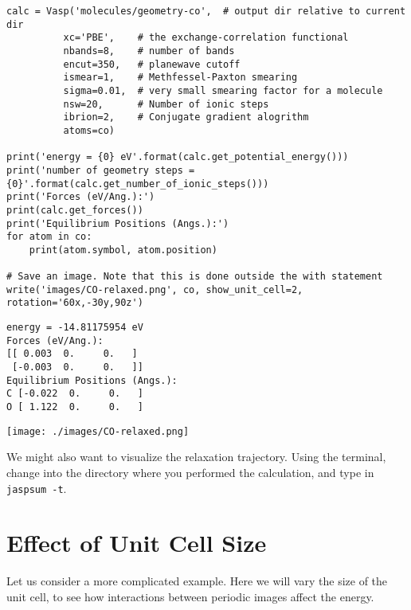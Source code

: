 \documentclass[11pt]{article}
\begin{document}
\begin{verbatim}
calc = Vasp('molecules/geometry-co',  # output dir relative to current dir
          xc='PBE',    # the exchange-correlation functional
          nbands=8,    # number of bands
          encut=350,   # planewave cutoff
          ismear=1,    # Methfessel-Paxton smearing
          sigma=0.01,  # very small smearing factor for a molecule
          nsw=20,      # Number of ionic steps
          ibrion=2,    # Conjugate gradient alogrithm
          atoms=co)

print('energy = {0} eV'.format(calc.get_potential_energy()))
print('number of geometry steps = {0}'.format(calc.get_number_of_ionic_steps()))
print('Forces (eV/Ang.):')
print(calc.get_forces())
print('Equilibrium Positions (Angs.):')
for atom in co:
    print(atom.symbol, atom.position)
    
# Save an image. Note that this is done outside the with statement
write('images/CO-relaxed.png', co, show_unit_cell=2, rotation='60x,-30y,90z')
\end{verbatim}

\begin{verbatim}
energy = -14.81175954 eV
Forces (eV/Ang.):
[[ 0.003  0.     0.   ]
 [-0.003  0.     0.   ]]
Equilibrium Positions (Angs.):
C [-0.022  0.     0.   ]
O [ 1.122  0.     0.   ]
\end{verbatim}

\begin{center}
\texttt{[image: ./images/CO-relaxed.png]}
\end{center}


We might also want to visualize the relaxation trajectory. Using the terminal, change into the directory where you performed the calculation, and type in \texttt{jaspsum -t}.


\section{Effect of Unit Cell Size}
\label{sec:orgf26b129}

Let us consider a more complicated example. Here we will vary the size of the unit cell, to see how interactions between periodic images affect the energy.
\end{document}

